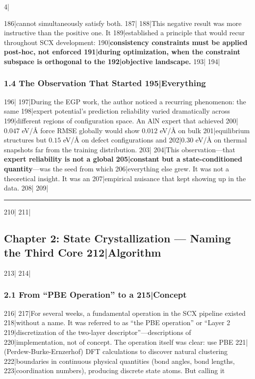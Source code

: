4|\documentclass[
5|  12pt,
6|]{ctexart}
\begin{document}
186|cannot simultaneously satisfy both.
187|
188|This negative result was more instructive than the positive one. It
189|established a principle that would recur throughout SCX development:
190|\textbf{consistency constraints must be applied post-hoc, not enforced
191|during optimization, when the constraint subspace is orthogonal to the
192|objective landscape.}
193|
194|\subsubsection{1.4 The Observation That Started
195|Everything}\label{the-observation-that-started-everything}
196|
197|During the EGP work, the author noticed a recurring phenomenon: the same
198|expert potential's prediction reliability varied dramatically across
199|different regions of configuration space. An AlN expert that achieved
200|\(0.047\) eV/Å force RMSE globally would show \(0.012\) eV/Å on bulk
201|equilibrium structures but \(0.15\) eV/Å on defect configurations and
202|\(0.30\) eV/Å on thermal snapshots far from the training distribution.
203|
204|This observation---that \textbf{expert reliability is not a global
205|constant but a state-conditioned quantity}---was the seed from which
206|everything else grew. It was not a theoretical insight. It was an
207|empirical nuisance that kept showing up in the data.
208|
209|\begin{center}\rule{0.5\linewidth}{0.5pt}\end{center}
210|
211|\subsection{Chapter 2: State Crystallization --- Naming the Third Core
212|Algorithm}\label{chapter-2-state-crystallization-naming-the-third-core-algorithm}
213|
214|\subsubsection{2.1 From ``PBE Operation'' to a
215|Concept}\label{from-pbe-operation-to-a-concept}
216|
217|For several weeks, a fundamental operation in the SCX pipeline existed
218|without a name. It was referred to as ``the PBE operation'' or ``Layer 2
219|discretization of the two-layer descriptor''---descriptions of
220|implementation, not of concept. The operation itself was clear: use PBE
221|(Perdew-Burke-Ernzerhof) DFT calculations to discover natural clustering
222|boundaries in continuous physical quantities (bond angles, bond lengths,
223|coordination numbers), producing discrete state atoms. But calling it
\end{document}
